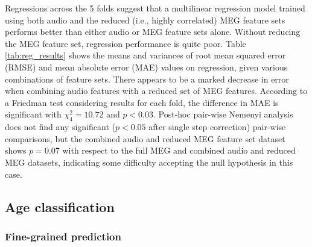 \documentclass[utf8]{frontiersSCNS} %
\begin{document}
Regressions across the 5 folds suggest that a multilinear regression model trained using both audio and the reduced (i.e., highly correlated) MEG feature sets performs better than either audio or MEG feature sets alone. Without reducing the MEG feature set, regression performance is quite poor. Table \ref{tab:reg_results} shows the means and variances of root mean squared error (RMSE) and mean absolute error (MAE) values on regression, given various combinations of feature sets. There appears to be a marked decrease in error when combining audio features with a reduced set of MEG features. According to a Friedman test considering results for each fold, the difference in MAE is significant with $\chi^2_4=10.72$ and $p<0.03$. Post-hoc pair-wise Nemenyi analysis does not find any significant ($p<0.05$ after single step correction) pair-wise comparisons, but the combined audio and reduced MEG feature set dataset shows $p=0.07$ with respect to the full MEG and combined audio and reduced MEG datasets, indicating some difficulty accepting the null hypothesis in this case. 

\subsection{Age classification}

\subsubsection{Fine-grained prediction}
\end{document}
